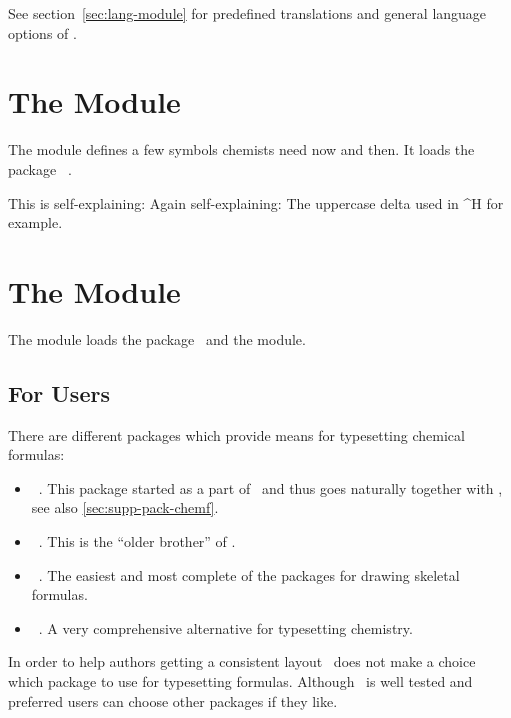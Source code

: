 \documentclass{chemmacros-manual}
\begin{document}
See section~\vref{sec:lang-module} for predefined translations and general
language options of \chemmacros.

\section{The  Module}\label{sec:symbols-module}

The  module defines a few symbols chemists need now and
then.  It loads the package ~\cite{pkg:amstext}.
\begin{commands}
    This is self-explaining: \transitionstatesymbol
    Again self-explaining: \standardstate
    The uppercase delta used in \state^{}{H} for example.
\end{commands}

\section{The  Module}\label{sec:formula-module}

The  module loads the 
package~\cite{pkg:amstext} and the  module.

\subsection{For Users}
There are different packages which provide means for typesetting chemical
formulas:
\begin{itemize}
  \item {}~\cite{pkg:chemformula}.  This package started as a
    part of \chemmacros\ and thus goes naturally together with \chemmacros,
    see also \vref{sec:supp-pack-chemf}.
  \item {}~\cite{pkg:mhchem}.  This is the \enquote{older brother} of
    \chemformula.
  \item {}~\cite{pkg:chemfig}.  The easiest and most complete of the
    packages for drawing skeletal formulas.
  \item \XyMTeX~\cite{pkg:xymtex}.  A very comprehensive alternative for
    typesetting chemistry.
\end{itemize}
In order to help authors getting a consistent layout \chemmacros\ does not
make a choice which package to use for typesetting formulas.  Although
\chemformula\ is well tested and preferred users can choose other packages if
they like.
\end{document}
